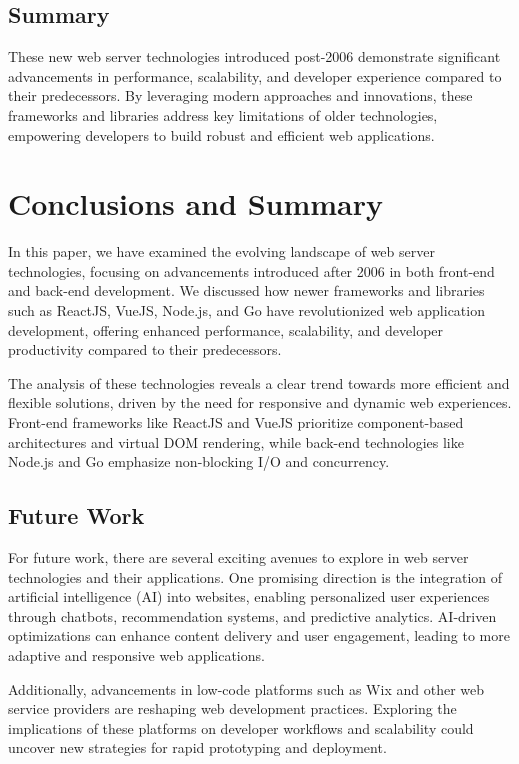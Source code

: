 \documentclass[conference]{IEEEtran}
\begin{document}
\subsection{Summary}

These new web server technologies introduced post-2006 demonstrate significant advancements in performance, scalability, and developer experience compared to their predecessors. By leveraging modern approaches and innovations, these frameworks and libraries address key limitations of older technologies, empowering developers to build robust and efficient web applications.

\section{Conclusions and Summary}

In this paper, we have examined the evolving landscape of web server technologies, focusing on advancements introduced after 2006 in both front-end and back-end development. We discussed how newer frameworks and libraries such as ReactJS, VueJS, Node.js, and Go have revolutionized web application development, offering enhanced performance, scalability, and developer productivity compared to their predecessors.

The analysis of these technologies reveals a clear trend towards more efficient and flexible solutions, driven by the need for responsive and dynamic web experiences. Front-end frameworks like ReactJS and VueJS prioritize component-based architectures and virtual DOM rendering, while back-end technologies like Node.js and Go emphasize non-blocking I/O and concurrency.

\subsection{Future Work}

For future work, there are several exciting avenues to explore in web server technologies and their applications. One promising direction is the integration of artificial intelligence (AI) into websites, enabling personalized user experiences through chatbots, recommendation systems, and predictive analytics. AI-driven optimizations can enhance content delivery and user engagement, leading to more adaptive and responsive web applications.

Additionally, advancements in low-code platforms such as Wix and other web service providers are reshaping web development practices. Exploring the implications of these platforms on developer workflows and scalability could uncover new strategies for rapid prototyping and deployment.
\end{document}
